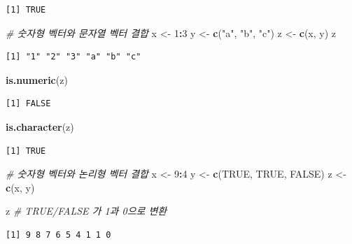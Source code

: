 \documentclass[
  11pt,
]{krantz}
\newenvironment{Shaded}{\begin{snugshade}}{\end{snugshade}}
\newcommand{\CommentTok}[1]{\textcolor[rgb]{0.37,0.37,0.37}{\textit{#1}}}
\newcommand{\DecValTok}[1]{\textcolor[rgb]{0.06,0.06,0.06}{#1}}
\newcommand{\KeywordTok}[1]{\textcolor[rgb]{0.27,0.27,0.27}{\textbf{#1}}}
\newcommand{\NormalTok}[1]{#1}
\newcommand{\OperatorTok}[1]{\textcolor[rgb]{0.43,0.43,0.43}{\textbf{#1}}}
\newcommand{\OtherTok}[1]{\textcolor[rgb]{0.37,0.37,0.37}{#1}}
\newcommand{\StringTok}[1]{\textcolor[rgb]{0.5,0.5,0.5}{#1}}
\begin{document}
\begin{verbatim}
[1] TRUE
\end{verbatim}

\begin{Shaded}
\begin{Highlighting}[]
\CommentTok{# 숫자형 벡터와 문자열 벡터 결합}
\NormalTok{x <-}\StringTok{ }\DecValTok{1}\OperatorTok{:}\DecValTok{3}
\NormalTok{y <-}\StringTok{ }\KeywordTok{c}\NormalTok{(}\StringTok{"a"}\NormalTok{, }\StringTok{"b"}\NormalTok{, }\StringTok{"c"}\NormalTok{)}
\NormalTok{z <-}\StringTok{ }\KeywordTok{c}\NormalTok{(x, y)}
\NormalTok{z}
\end{Highlighting}
\end{Shaded}

\begin{verbatim}
[1] "1" "2" "3" "a" "b" "c"
\end{verbatim}

\begin{Shaded}
\begin{Highlighting}[]
\KeywordTok{is.numeric}\NormalTok{(z)}
\end{Highlighting}
\end{Shaded}

\begin{verbatim}
[1] FALSE
\end{verbatim}

\begin{Shaded}
\begin{Highlighting}[]
\KeywordTok{is.character}\NormalTok{(z)}
\end{Highlighting}
\end{Shaded}

\begin{verbatim}
[1] TRUE
\end{verbatim}

\begin{Shaded}
\begin{Highlighting}[]
\CommentTok{# 숫자형 벡터와 논리형 벡터 결합}
\NormalTok{x <-}\StringTok{ }\DecValTok{9}\OperatorTok{:}\DecValTok{4}
\NormalTok{y <-}\StringTok{ }\KeywordTok{c}\NormalTok{(}\OtherTok{TRUE}\NormalTok{, }\OtherTok{TRUE}\NormalTok{, }\OtherTok{FALSE}\NormalTok{)}
\NormalTok{z <-}\StringTok{ }\KeywordTok{c}\NormalTok{(x, y)}

\NormalTok{z }\CommentTok{# TRUE/FALSE 가 1과 0으로 변환}
\end{Highlighting}
\end{Shaded}

\begin{verbatim}
[1] 9 8 7 6 5 4 1 1 0
\end{verbatim}
\end{document}
